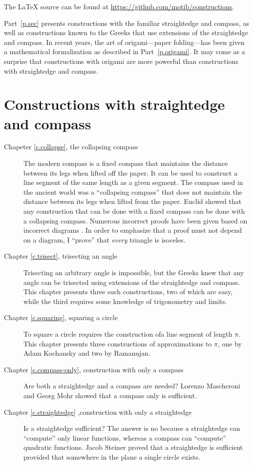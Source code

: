 The \LaTeX{} source can be found at \url{https://github.com/motib/constructions}.

Part~\ref{p.sec} presents constructions with the familiar straightedge and compass, as well as constructions known to the Greeks that use extensions of the straightedge and compass. In recent years, the art of origami---paper folding---has been given a mathematical formalization as described in Part~\ref{p.origami}. It may come as a surprise that constructions with origami are more powerful than constructions with straightedge and compass.

\section{Constructions with straightedge and compass}

\begin{description}
\item[Chapeter \ref{c.collapse}, the collapsing compass] The modern compass is a fixed compass that maintains the distance between its legs when lifted off the paper. It can be used to construct a line segment of the same length as a given segment. The compass used in the ancient world was a ``collapsing compass'' that does not maintain the distance between its legs when lifted from the paper. Euclid showed that any construction that can be done with a fixed compass can be done with a collapsing compass. Numerous incorrect proofs have been given based on incorrect diagrams \cite{toussaint}. In order to emphasize that a proof must not depend on a diagram, I ``prove'' that \emph{every} triangle is isoceles.

\item[Chapter \ref{c.trisect}, trisecting an angle] Trisecting an arbitrary angle is impossible, but the Greeks knew that any angle can be trisected using extensions of the straightedge and compass. This chapter presents three such constructions, two of which are easy, while the third requires some knowledge of trigonometry and limits.

\item[Chapter \ref{c.squaring}, squaring a circle] To square a circle requires the construction ofa line segment of length $\pi$. This chapter presents three constructions of approximations to $\pi$, one by Adam Kochansky and two by Ramanujan.

\item[Chapter \ref{c.compass-only}, construction with only a compass] Are both a straightedge and a compass are needed? Lorenzo Mascheroni and Georg Mohr showed that a compass only is sufficient. 

\item[Chapter \ref{c.straightedge} ,construction with only a straightedge] Is a straightedge sufficient? The answer is no because a straightedge can ``compute'' only linear functions, whereas a compass can ``compute'' quadratic functions. Jacob Steiner proved that a straightedge is sufficient provided that somewhere in the plane a single circle exists. 
\end{description}

